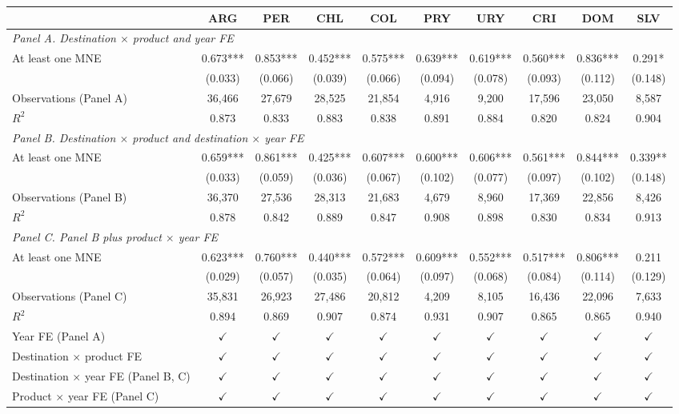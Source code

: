 \begin{tabular}{l*{9}{c}}
\toprule
 & ARG & PER & CHL & COL & PRY & URY & CRI & DOM & SLV \\
\midrule
\multicolumn{10}{l}{\textit{Panel A. Destination $\times$ product and year FE}} \\
At least one MNE & 0.673*** & 0.853*** & 0.452*** & 0.575*** & 0.639*** & 0.619*** & 0.560*** & 0.836*** & 0.291* \\
 & (0.033) & (0.066) & (0.039) & (0.066) & (0.094) & (0.078) & (0.093) & (0.112) & (0.148) \\
Observations (Panel A) & 36,466 & 27,679 & 28,525 & 21,854 & 4,916 & 9,200 & 17,596 & 23,050 & 8,587 \\
$R^2$ & 0.873 & 0.833 & 0.883 & 0.838 & 0.891 & 0.884 & 0.820 & 0.824 & 0.904 \\
\midrule
\multicolumn{10}{l}{\textit{Panel B. Destination $\times$ product and destination $\times$ year FE}} \\
At least one MNE & 0.659*** & 0.861*** & 0.425*** & 0.607*** & 0.600*** & 0.606*** & 0.561*** & 0.844*** & 0.339** \\
 & (0.033) & (0.059) & (0.036) & (0.067) & (0.102) & (0.077) & (0.097) & (0.102) & (0.148) \\
Observations (Panel B) & 36,370 & 27,536 & 28,313 & 21,683 & 4,679 & 8,960 & 17,369 & 22,856 & 8,426 \\
$R^2$ & 0.878 & 0.842 & 0.889 & 0.847 & 0.908 & 0.898 & 0.830 & 0.834 & 0.913 \\
\midrule
\multicolumn{10}{l}{\textit{Panel C. Panel B plus product $\times$ year FE}} \\
At least one MNE & 0.623*** & 0.760*** & 0.440*** & 0.572*** & 0.609*** & 0.552*** & 0.517*** & 0.806*** & 0.211 \\
 & (0.029) & (0.057) & (0.035) & (0.064) & (0.097) & (0.068) & (0.084) & (0.114) & (0.129) \\
Observations (Panel C) & 35,831 & 26,923 & 27,486 & 20,812 & 4,209 & 8,105 & 16,436 & 22,096 & 7,633 \\
$R^2$ & 0.894 & 0.869 & 0.907 & 0.874 & 0.931 & 0.907 & 0.865 & 0.865 & 0.940 \\
\midrule
Year FE (Panel A) & $\checkmark$ & $\checkmark$ & $\checkmark$ & $\checkmark$ & $\checkmark$ & $\checkmark$ & $\checkmark$ & $\checkmark$ & $\checkmark$ \\
Destination $\times$ product FE & $\checkmark$ & $\checkmark$ & $\checkmark$ & $\checkmark$ & $\checkmark$ & $\checkmark$ & $\checkmark$ & $\checkmark$ & $\checkmark$ \\
Destination $\times$ year FE (Panel B, C) & $\checkmark$ & $\checkmark$ & $\checkmark$ & $\checkmark$ & $\checkmark$ & $\checkmark$ & $\checkmark$ & $\checkmark$ & $\checkmark$ \\
Product $\times$ year FE (Panel C) & $\checkmark$ & $\checkmark$ & $\checkmark$ & $\checkmark$ & $\checkmark$ & $\checkmark$ & $\checkmark$ & $\checkmark$ & $\checkmark$ \\
\bottomrule
\end{tabular}
